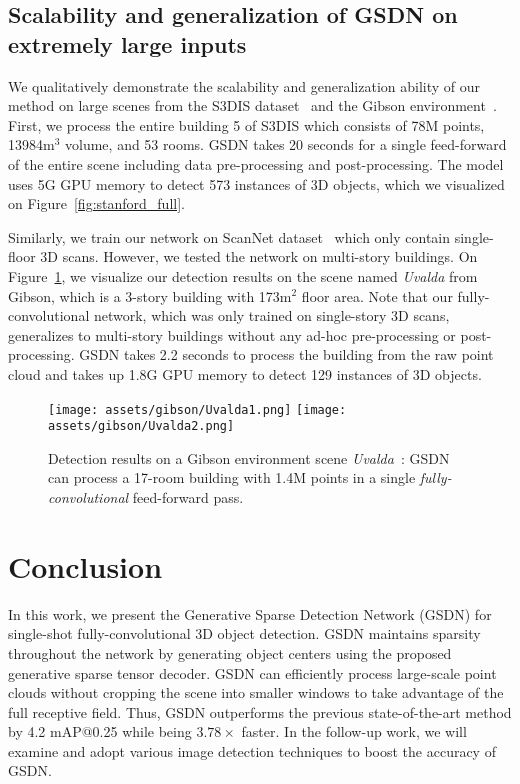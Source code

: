 \documentclass[runningheads]{llncs}
\newcommand{\methodname}{GSDN\xspace}
\begin{document}
\subsection{Scalability and generalization of \methodname on extremely large inputs}
\label{sec:scalability}


We qualitatively demonstrate the scalability and generalization ability of our method on large scenes from the S3DIS dataset~\cite{armeni_cvpr16} and the Gibson environment~\cite{xiazamirhe2018gibsonenv}.
First, we process the entire building 5 of S3DIS which consists of 78M points, 13984m${}^3$ volume, and 53 rooms.
\methodname takes 20 seconds for a single feed-forward of the entire scene including data pre-processing and post-processing. The model uses 5G GPU memory to detect 573 instances of 3D objects, which we visualized on Figure~\ref{fig:stanford_full}.

Similarly, we train our network on ScanNet dataset~\cite{dai2017scannet} which only contain single-floor 3D scans. However, we tested the network on multi-story buildings. On Figure~\ref{fig:gibson}, we visualize our detection results on the scene named \textit{Uvalda} from Gibson, which is a 3-story building with 173m${}^2$ floor area. Note that our fully-convolutional network, which was only trained on single-story 3D scans, generalizes to multi-story buildings without any ad-hoc pre-processing or post-processing.
\methodname takes 2.2 seconds to process the building from the raw point cloud and takes up 1.8G GPU memory to detect 129 instances of 3D objects.


\begin{figure}[h]
    \centering
    \texttt{[image: assets/gibson/Uvalda1.png]}
    \texttt{[image: assets/gibson/Uvalda2.png]}
    \caption{Detection results on a Gibson environment scene \textit{Uvalda}~\cite{xiazamirhe2018gibsonenv}: \methodname can process a 17-room building with 1.4M points in a single \textit{fully-convolutional} feed-forward pass.} \label{fig:gibson}
    \vspace{-1em}
\end{figure} 
\section{Conclusion}

In this work, we present the Generative Sparse Detection Network (\methodname) for single-shot fully-convolutional 3D object detection. \methodname maintains sparsity throughout the network by generating object centers using the proposed generative sparse tensor decoder. \methodname can efficiently process large-scale point clouds without cropping the scene into smaller windows to take advantage of the full receptive field. Thus, \methodname outperforms the previous state-of-the-art method by 4.2 mAP@0.25 while being $3.78\times$ faster. In the follow-up work, we will examine and adopt various image detection techniques to boost the accuracy of \methodname.
\end{document}
